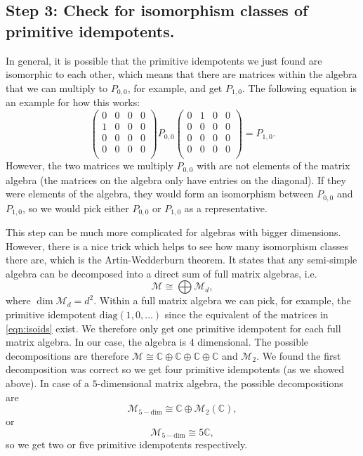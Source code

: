 \subsection*{Step 3: Check for isomorphism classes of primitive idempotents.} In general, it is possible that the primitive idempotents we just found are isomorphic to each other, which means that there are matrices within the algebra that we can multiply to $P_{0,0}$, for example, and get $P_{1,0}$. The following equation is an example for how this works:
	\begin{equation}
		\begin{pmatrix} 0 & 0 & 0 & 0\\ 1 & 0 & 0 & 0\\ 0 & 0 & 0 & 0\\ 0 & 0 & 0 & 0\\ \end{pmatrix}P_{0,0} \begin{pmatrix} 0 & 1 & 0 & 0\\ 0 & 0 & 0 & 0\\ 0 & 0 & 0 & 0\\ 0 & 0 & 0 & 0\\ \end{pmatrix}=P_{1,0}.\label{eqn:isoids}
	\end{equation}
However, the two matrices we multiply $P_{0,0}$ with are not elements of the matrix algebra (the matrices on the algebra only have entries on the diagonal). If they were elements of the algebra, they would form an isomorphism between $P_{0,0}$ and $P_{1,0}$, so we would pick either $P_{0,0}$ or $P_{1,0}$ as a representative.

This step can be much more complicated for algebras with bigger dimensions. However, there is a nice trick which helps to see how many isomorphism classes there are, which is the Artin-Wedderburn theorem. It states that any semi-simple algebra can be decomposed into a direct sum of full matrix algebras, i.e.
	\begin{equation}
		\mathcal{M}\cong\bigoplus\mathcal{M}_d,
	\end{equation}
	where $\dim{\mathcal{M}_d}=d^2$. Within a full matrix algebra we can pick, for example, the primitive idempotent $\mathrm{diag}(1,0,\ldots)$ since the equivalent of the matrices in \ref{eqn:isoids} exist. We therefore only get one primitive idempotent for each full matrix algebra. In our case, the algebra is 4 dimensional. The possible decompositions are therefore 
	$\mathcal{M}\cong\mathbb{C}\oplus\mathbb{C}\oplus\mathbb{C}\oplus\mathbb{C}$ and $\mathcal{M}_2$. We found the first decomposition was correct so we get four primitive idempotents (as we showed above). 
	In case of a $5$-dimensional matrix algebra, the possible decompositions are
	\begin{equation}
		\mathcal{M}_{5-\mathrm{dim}}\cong\mathbb{C}\oplus\mathcal{M}_2(\mathbb{C}),
	\end{equation}
	or 
	\begin{equation}
		\mathcal{M}_{5-\mathrm{dim}}\cong5\mathbb{C},
	\end{equation}
so we get two or five primitive idempotents respectively.
	
